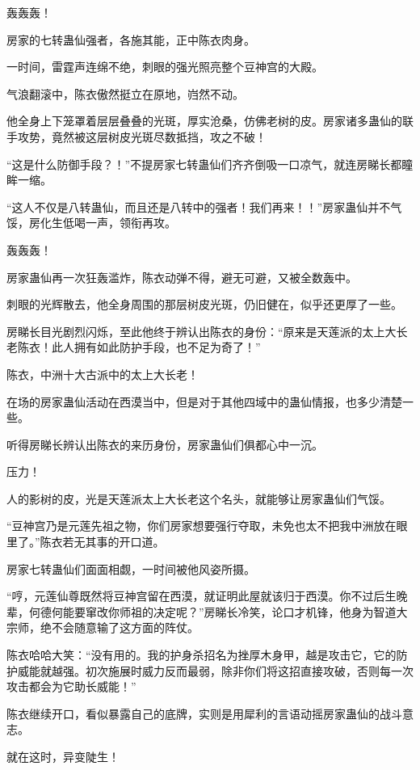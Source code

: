 
\begin{this_body}

轰轰轰！

房家的七转蛊仙强者，各施其能，正中陈衣肉身。

一时间，雷霆声连绵不绝，刺眼的强光照亮整个豆神宫的大殿。

气浪翻滚中，陈衣傲然挺立在原地，岿然不动。

他全身上下笼罩着层层叠叠的光斑，厚实沧桑，仿佛老树的皮。房家诸多蛊仙的联手攻势，竟然被这层树皮光斑尽数抵挡，攻之不破！

“这是什么防御手段？！”不提房家七转蛊仙们齐齐倒吸一口凉气，就连房睇长都瞳眸一缩。

“这人不仅是八转蛊仙，而且还是八转中的强者！我们再来！！”房家蛊仙并不气馁，房化生低喝一声，领衔再攻。

轰轰轰！

房家蛊仙再一次狂轰滥炸，陈衣动弹不得，避无可避，又被全数轰中。

刺眼的光辉散去，他全身周围的那层树皮光斑，仍旧健在，似乎还更厚了一些。

房睇长目光剧烈闪烁，至此他终于辨认出陈衣的身份：“原来是天莲派的太上大长老陈衣！此人拥有如此防护手段，也不足为奇了！”

陈衣，中洲十大古派中的太上大长老！

在场的房家蛊仙活动在西漠当中，但是对于其他四域中的蛊仙情报，也多少清楚一些。

听得房睇长辨认出陈衣的来历身份，房家蛊仙们俱都心中一沉。

压力！

人的影树的皮，光是天莲派太上大长老这个名头，就能够让房家蛊仙们气馁。

“豆神宫乃是元莲先祖之物，你们房家想要强行夺取，未免也太不把我中洲放在眼里了。”陈衣若无其事的开口道。

房家七转蛊仙们面面相觑，一时间被他风姿所摄。

“哼，元莲仙尊既然将豆神宫留在西漠，就证明此屋就该归于西漠。你不过后生晚辈，何德何能要窜改你师祖的决定呢？”房睇长冷笑，论口才机锋，他身为智道大宗师，绝不会随意输了这方面的阵仗。

陈衣哈哈大笑：“没有用的。我的护身杀招名为挫厚木身甲，越是攻击它，它的防护威能就越强。初次施展时威力反而最弱，除非你们将这招直接攻破，否则每一次攻击都会为它助长威能！”

陈衣继续开口，看似暴露自己的底牌，实则是用犀利的言语动摇房家蛊仙的战斗意志。

就在这时，异变陡生！


\end{this_body}
